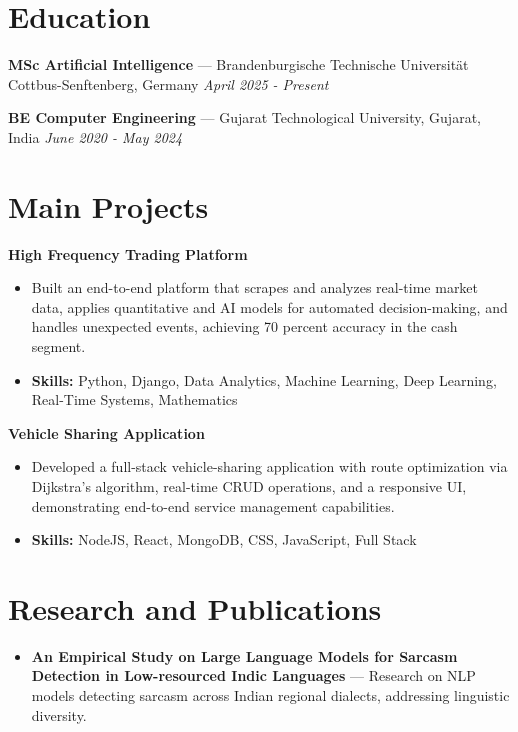 \documentclass[a4paper,10pt]{article}
\begin{document}
\section*{Education}
\textbf{MSc Artificial Intelligence} — Brandenburgische Technische Universität Cottbus-Senftenberg, Germany \hfill \textit{April 2025 - Present}\par
\vspace{1.5pt}
\textbf{BE Computer Engineering} — Gujarat Technological University, Gujarat, India \hfill \textit{June 2020 - May 2024}\par

\section*{Main Projects}
\textbf{High Frequency Trading Platform}\par
\vspace{1pt}
\begin{itemize}
  \item Built an end-to-end platform that scrapes and analyzes real-time market data, applies quantitative and AI models for automated decision-making, and handles unexpected events, achieving 70 percent accuracy in the cash segment.
  \item \textbf{Skills:} Python, Django, Data Analytics, Machine Learning, Deep Learning, Real-Time Systems, Mathematics
\end{itemize}
\vspace{3pt}
\textbf{Vehicle Sharing Application}\par
\vspace{1pt}
\begin{itemize}
  \item Developed a full-stack vehicle-sharing application with route optimization via Dijkstra's algorithm, real-time CRUD operations, and a responsive UI, demonstrating end-to-end service management capabilities.
  \item \textbf{Skills:} NodeJS, React, MongoDB, CSS, JavaScript, Full Stack
\end{itemize}

\section*{Research and Publications}
\begin{itemize}
\item \textbf{An Empirical Study on Large Language Models for Sarcasm Detection in Low-resourced Indic Languages} — Research on NLP models detecting sarcasm across Indian regional dialects, addressing linguistic diversity.
\end{itemize}
\end{document}
